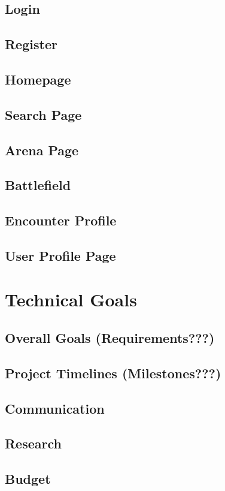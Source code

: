 \documentclass[12pt,a4paper]{report}
\begin{document}
		\subsection{Login}
		\subsection{Register}
		\subsection{Homepage}
		\subsection{Search Page}
		\subsection{Arena Page}
		\subsection{Battlefield}
		\subsection{Encounter Profile}
		\subsection{User Profile Page}
	
	\newpage
	\section{Technical Goals}
		\subsection{Overall Goals (Requirements???)}
		\subsection{Project Timelines (Milestones???)}
		\subsection{Communication}
		\subsection{Research}
		\subsection{Budget}
	
\end{document}
